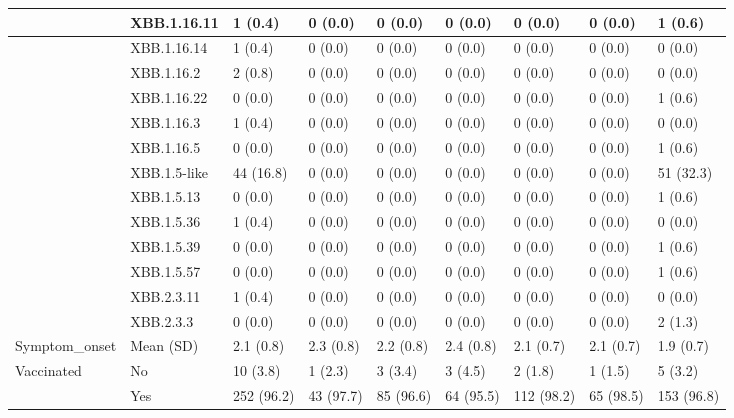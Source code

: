 \begin{tabular}{l|l|l|l|l|l|l|l|l}
 & XBB.1.16.11 & 1 (0.4) & 0 (0.0) & 0 (0.0) & 0 (0.0) & 0 (0.0) & 0 (0.0) & 1 (0.6)\\
\hline
 & XBB.1.16.14 & 1 (0.4) & 0 (0.0) & 0 (0.0) & 0 (0.0) & 0 (0.0) & 0 (0.0) & 0 (0.0)\\
\hline
 & XBB.1.16.2 & 2 (0.8) & 0 (0.0) & 0 (0.0) & 0 (0.0) & 0 (0.0) & 0 (0.0) & 0 (0.0)\\
\hline
 & XBB.1.16.22 & 0 (0.0) & 0 (0.0) & 0 (0.0) & 0 (0.0) & 0 (0.0) & 0 (0.0) & 1 (0.6)\\
\hline
 & XBB.1.16.3 & 1 (0.4) & 0 (0.0) & 0 (0.0) & 0 (0.0) & 0 (0.0) & 0 (0.0) & 0 (0.0)\\
\hline
 & XBB.1.16.5 & 0 (0.0) & 0 (0.0) & 0 (0.0) & 0 (0.0) & 0 (0.0) & 0 (0.0) & 1 (0.6)\\
\hline
 & XBB.1.5-like & 44 (16.8) & 0 (0.0) & 0 (0.0) & 0 (0.0) & 0 (0.0) & 0 (0.0) & 51 (32.3)\\
\hline
 & XBB.1.5.13 & 0 (0.0) & 0 (0.0) & 0 (0.0) & 0 (0.0) & 0 (0.0) & 0 (0.0) & 1 (0.6)\\
\hline
 & XBB.1.5.36 & 1 (0.4) & 0 (0.0) & 0 (0.0) & 0 (0.0) & 0 (0.0) & 0 (0.0) & 0 (0.0)\\
\hline
 & XBB.1.5.39 & 0 (0.0) & 0 (0.0) & 0 (0.0) & 0 (0.0) & 0 (0.0) & 0 (0.0) & 1 (0.6)\\
\hline
 & XBB.1.5.57 & 0 (0.0) & 0 (0.0) & 0 (0.0) & 0 (0.0) & 0 (0.0) & 0 (0.0) & 1 (0.6)\\
\hline
 & XBB.2.3.11 & 1 (0.4) & 0 (0.0) & 0 (0.0) & 0 (0.0) & 0 (0.0) & 0 (0.0) & 0 (0.0)\\
\hline
 & XBB.2.3.3 & 0 (0.0) & 0 (0.0) & 0 (0.0) & 0 (0.0) & 0 (0.0) & 0 (0.0) & 2 (1.3)\\
\hline
Symptom\_onset & Mean (SD) & 2.1 (0.8) & 2.3 (0.8) & 2.2 (0.8) & 2.4 (0.8) & 2.1 (0.7) & 2.1 (0.7) & 1.9 (0.7)\\
\hline
Vaccinated & No & 10 (3.8) & 1 (2.3) & 3 (3.4) & 3 (4.5) & 2 (1.8) & 1 (1.5) & 5 (3.2)\\
\hline
 & Yes & 252 (96.2) & 43 (97.7) & 85 (96.6) & 64 (95.5) & 112 (98.2) & 65 (98.5) & 153 (96.8)\\
\hline
\end{tabular}
